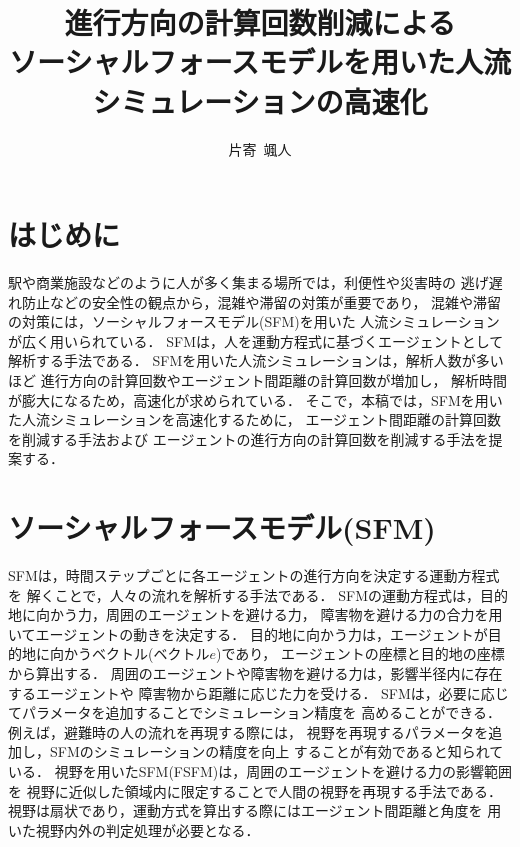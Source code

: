 \documentclass{maelab_y}
\begin{document}
\title{進行方向の計算回数削減による
\\ソーシャルフォースモデルを用いた人流シミュレーションの高速化}
\author{片寄\ 颯人}
\maketitle

\section{はじめに}
駅や商業施設などのように人が多く集まる場所では，利便性や災害時の
逃げ遅れ防止などの安全性の観点から，混雑や滞留の対策が重要であり，
混雑や滞留の対策には，ソーシャルフォースモデル(SFM)を用いた
人流シミュレーションが広く用いられている\cite{helbing_sfm}．
SFMは，人を運動方程式に基づくエージェントとして解析する手法である．
SFMを用いた人流シミュレーションは，解析人数が多いほど	
進行方向の計算回数やエージェント間距離の計算回数が増加し，
解析時間が膨大になるため，高速化が求められている．
そこで，本稿では，SFMを用いた人流シミュレーションを高速化するために，
エージェント間距離の計算回数を削減する手法および
エージェントの進行方向の計算回数を削減する手法を提案する．

\section{ソーシャルフォースモデル(SFM)}
SFMは，時間ステップごとに各エージェントの進行方向を決定する運動方程式を
解くことで，人々の流れを解析する手法である．
SFMの運動方程式は，目的地に向かう力，周囲のエージェントを避ける力，
障害物を避ける力の合力を用いてエージェントの動きを決定する．
目的地に向かう力は，エージェントが目的地に向かうベクトル(ベクトル$e$)であり，
エージェントの座標と目的地の座標から算出する．
周囲のエージェントや障害物を避ける力は，影響半径内に存在するエージェントや
障害物から距離に応じた力を受ける．
SFMは，必要に応じてパラメータを追加することでシミュレーション精度を
高めることができる．例えば，避難時の人の流れを再現する際には，
視野を再現するパラメータを追加し，SFMのシミュレーションの精度を向上
することが有効であると知られている\cite{21_Isozaki}．
視野を用いたSFM(FSFM)は，周囲のエージェントを避ける力の影響範囲を
視野に近似した領域内に限定することで人間の視野を再現する手法である．
視野は扇状であり，運動方式を算出する際にはエージェント間距離と角度を
用いた視野内外の判定処理が必要となる．
\end{document}
